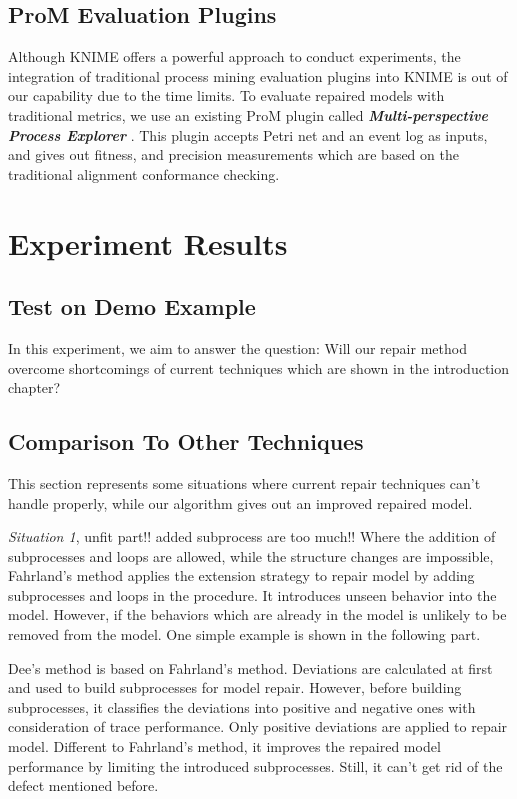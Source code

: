 \subsection{ProM Evaluation Plugins}
Although KNIME offers a powerful approach to conduct experiments, the integration of traditional process mining evaluation plugins into KNIME is out of our capability due to the time limits. To evaluate repaired models with traditional metrics, we use an existing ProM plugin called \textbf{\emph{Multi-perspective Process Explorer}} \cite{mannhardt2015multi}. This plugin accepts  Petri net and an event log as inputs, and gives out fitness, and precision measurements which are based on the traditional alignment conformance checking. 
\section{Experiment Results}
\subsection{Test on Demo Example}
In this experiment, we aim to answer the question: Will our repair method overcome shortcomings of current techniques which are shown in the introduction chapter?  


\subsection{Comparison To Other Techniques}
This section represents some situations where current repair techniques can't handle properly, while our algorithm gives out an improved repaired model. 

\emph{Situation 1}, unfit part!! added subprocess are too much!! Where the addition of subprocesses and loops are allowed, while the structure changes are impossible, 
Fahrland's method applies the extension strategy to repair model by adding subprocesses and loops in the procedure. It introduces unseen behavior into the model. However, if the behaviors which are already in the model is unlikely to be removed from the model. One simple example is shown in the following part. 

Dee's method is based on Fahrland's method. Deviations are calculated at first and used to build subprocesses for model repair. However, before building subprocesses, it classifies the deviations into positive and negative ones with consideration of trace performance. Only positive deviations are applied to repair model. Different to Fahrland's method, it improves the repaired model performance by limiting the introduced subprocesses. Still, it can't get rid of the defect mentioned before. 

